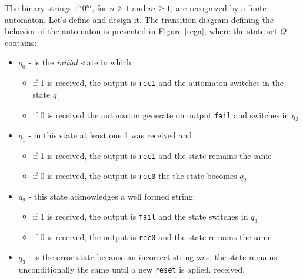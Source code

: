 \begin{exemplu}\label{regLang}
The binary strings $1^{n}0^{m}$, for $n \geq 1$ and $m \geq 1$,
are recognized by a finite automaton.
Let's define and design it. The transition diagram defining the
behavior of the automaton is presented in Figure \ref{rega},
where the state set $Q$ contains:


\begin{itemize}
    \item $q_{0}$ - is the {\em initial} state in which:
        \begin{itemize}
            \item if 1 is received, the output is {\tt rec1} and the automaton switches in the state $q_{1}$
            \item if 0 is received the automaton generate on output {\tt fail} and switches in $q_{3}$
        \end{itemize}
    \item $q_{1}$ - in this state at least one 1 was received and
        \begin{itemize}
            \item if 1 is received, the output is {\tt rec1} and the state remains the same
            \item if 0 is received, the output is {\tt rec0} the the state becomes $q_{2}$
        \end{itemize}
    \item $q_{2}$ - this state acknowledges a well formed string:
        \begin{itemize}
            \item if 1 is received, the output is {\tt fail} and the state switches in $q_{3}$
            \item if 0 is received, the output is {\tt rec0} and the state remains the same
        \end{itemize}
    \item $q_{3}$ - is the  error state because  an incorrect string was; the state remains unconditionally the same until a new {\tt reset} is aplied.
    received.
\end{itemize}




\end{exemplu}
